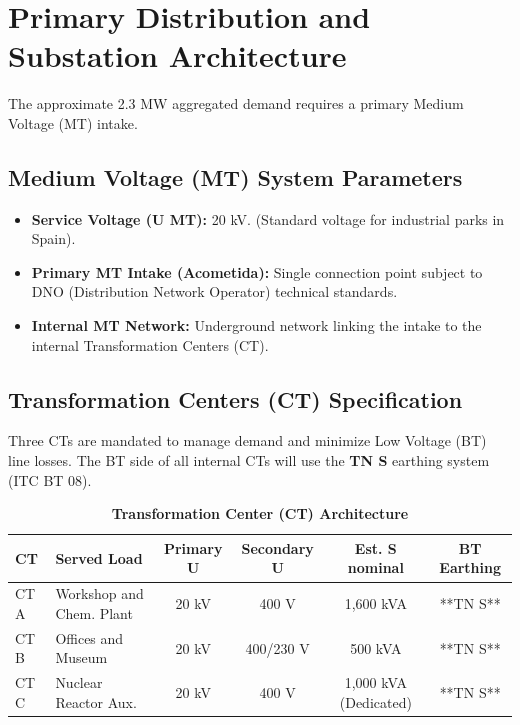 \documentclass[10pt, a4paper]{article}
\begin{document}
\section{Primary Distribution and Substation Architecture}
The approximate 2.3 MW aggregated demand requires a primary Medium Voltage (MT) intake.

\subsection{Medium Voltage (MT) System Parameters}
\begin{itemize}
    \item \textbf{Service Voltage (U MT):} 20 kV. (Standard voltage for industrial parks in Spain).
    \item \textbf{Primary MT Intake (Acometida):} Single connection point subject to DNO (Distribution Network Operator) technical standards.
    \item \textbf{Internal MT Network:} Underground network linking the intake to the internal Transformation Centers (CT).
\end{itemize}

\subsection{Transformation Centers (CT) Specification}
Three CTs are mandated to manage demand and minimize Low Voltage (BT) line losses. The BT side of all internal CTs will use the \textbf{TN S} earthing system (ITC BT 08).

\begin{table}[h!]
    \centering
    \caption{\textbf{Transformation Center (CT) Architecture}}
    \label{tab:ct architecture}
    \begin{tabular}{|l|p{3.5cm}|c|c|c|c|}
        \hline
        \textbf{CT} & \textbf{Served Load} & \textbf{Primary U} & \textbf{Secondary U} & \textbf{Est. S nominal} & \textbf{BT Earthing} \\
        \hline
        CT A & Workshop and Chem. Plant & 20 kV & 400 V & 1,600 kVA & **TN S** \\
        \hline
        CT B & Offices and Museum & 20 kV & 400/230 V & 500 kVA & **TN S** \\
        \hline
        CT C & Nuclear Reactor Aux. & 20 kV & 400 V & 1,000 kVA (Dedicated) & **TN S** \\
        \hline
    \end{tabular}
\end{table}
\end{document}
